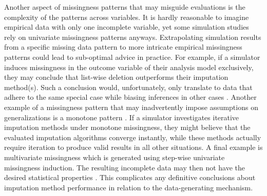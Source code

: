 \documentclass[bimj,fleqn]{w-art}
\begin{document}

Another aspect of missingness patterns that may misguide evaluations is the complexity of the patterns across variables. It is hardly reasonable to imagine empirical data with only one incomplete variable, yet some simulation studies rely on univariate missingness patterns anyways. Extrapolating simulation results from a specific missing data pattern to more intricate empirical missingness patterns could lead to sub-optimal advice in practice. For example, if a simulator induces missingness in the outcome variable of their analysis model exclusively, they may conclude that list-wise deletion outperforms their imputation method(s). Such a conclusion would, unfortunately, only translate to data that adhere to the same special case while biasing inferences in other cases \citep[][\S 2.7]{buur18}. Another example of a missingness pattern that may inadvertently impose assumptions on generalizations is a monotone pattern \citep[i.e. a pattern with uniformly increasing missingness proportions along variables;][]{litt20}. If a simulator investigates iterative imputation methods under monotone missingness, they might believe that the evaluated imputation algorithms converge instantly, while these methods actually require iteration to produce valid results in all other situations. A final example is multivariate missingness which is generated using step-wise univariate missingness induction. The resulting incomplete data may then not have the desired statistical properties \citep[e.g. skewness;][]{ampute}. This complicates any definitive conclusions about imputation method performance in relation to the data-generating mechanism.
\end{document}
